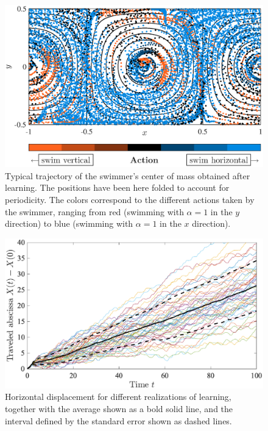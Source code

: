 \documentclass[prl,aps,superscriptaddress,twocolumn]{revtex4-1}
\begin{document}
\begin{figure}[ht]
  \centerline{\includegraphics[width=\columnwidth]{traj_centerofmass}}
  \caption{\label{fig:traj_centerofmass} Typical trajectory of the swimmer's center of mass obtained after learning. The positions have been here folded to account for periodicity. The colors correspond to the different actions taken by the swimmer, ranging from red (swimming with $\alpha = 1$ in the $y$ direction) to blue (swimming with $\alpha = 1$ in the $x$ direction).}
\end{figure}

\begin{figure}[ht]
  \centerline{\includegraphics[width=\columnwidth]{travel_learn_diffreal}}
  \caption{\label{fig:travel_learn_diffreal} Horizontal displacement for different realizations of  learning, together with the average shown as a bold solid line, and the interval defined by the standard error shown as dashed lines.}
\end{figure}



\end{document}
